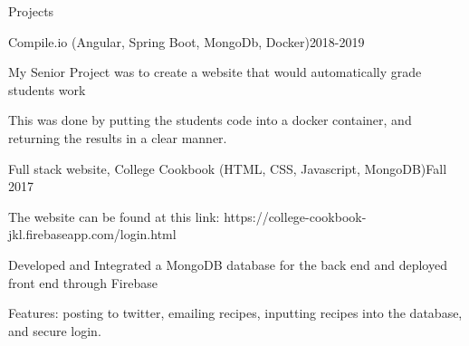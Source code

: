 \documentclass{resume} %
\begin{document}
\begin{rSection}{Projects}

\begin{rsemisection}{Compile.io (Angular, Spring Boot, MongoDb, Docker)}{2018-2019}
\item My Senior Project was to create a website that would automatically grade students work
\item This was done by putting the students code into a docker container, and returning the results in a clear manner.
\end{rsemisection}

\begin{rsemisection}{Full stack website, College Cookbook (HTML, CSS, Javascript, MongoDB)}{Fall 2017}
\item The website can be found at this link: https://college-cookbook-jkl.firebaseapp.com/login.html
\item Developed and Integrated a MongoDB database for the back end and deployed front end through Firebase
\item Features: posting to twitter, emailing recipes, inputting recipes into the database, and secure login. 
\end{rsemisection}




\end{rSection}
\end{document}
